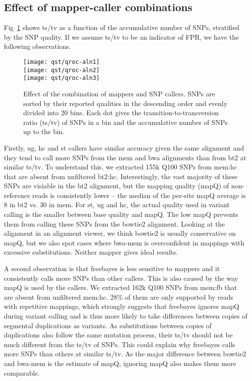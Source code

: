 \documentclass{bioinfo}
\newcommand{\textssf}[1]{\textsf{\footnotesize #1}}
\begin{document}
\subsection{Effect of mapper-caller combinations}

Fig~\ref{fig:qroc1} shows ts/tv as a function of the accumulative number of
SNPs, stratified by the SNP quality. If we assume ts/tv to be an indicator of
FPR, we have the following observations.

\begin{figure}[!hp]
\centering\texttt{[image: qst/qroc-aln1]}\\
\centering\texttt{[image: qst/qroc-aln2]}\\
\centering\texttt{[image: qst/qroc-aln3]}
\caption{Effect of the combination of mappers and SNP callers. SNPs are sorted
by their reported qualities in the descending order and evenly divided into 20
bins. Each dot gives the transition-to-transversion ratio (ts/tv) of SNPs in a
bin and the accumulative number of SNPs up to the bin.}\label{fig:qroc1} \end{figure}

Firstly, \textssf{ug}, \textssf{hc} and \textssf{st} callers have similar
accuracy given the same alignment and they tend to call more SNPs from the
\textssf{mem} and \textssf{bwa} alignments than from \textssf{bt2} at similar
ts/tv. To understand this, we extracted 155k Q100 SNPs from \textssf{mem:hc}
that are absent from unfiltered \textssf{bt2:hc}. Interestingly, the vast
majority of these SNPs are visiable in the \textssf{bt2} alignment, but the
mapping quality (mapQ) of non-reference reads is consistently lower -- the
median of the per-site mapQ average is 8 in \textssf{bt2} vs. 30 in \textssf{mem}.
For \textssf{st}, \textssf{ug} and \textssf{hc}, the actual quality used in
variant calling is the smaller between base quality and mapQ. The low mapQ
prevents them from calling these SNPs from the \textssf{bowtie2} alignment.
Looking at the alignment in an alignment viewer, we think \textssf{bowtie2} is
usually conservative on mapQ, but we also spot cases where bwa-mem is
overconfident in mappings with excessive substitutions. Neither mapper gives
ideal results.

A second observation is that \textssf{freebayes} is less sensitive to mappers and it
consistently calls more SNPs than other callers. This is also caused by the way
mapQ is used by the callers. We extracted 162k Q100 SNPs from \textssf{mem:fb}
that are absent from unfiltered \textssf{mem:hc}. 28\% of them are only
supported by reads with repetitive mappings, which strongly suggests that
\textssf{freebayes} ignores mapQ during variant calling and is thus more likely
to take differences between copies of segmental duplications as variants. As
substitutions between copies of duplications also follow the same mutation
process, their ts/tv should not be much different from the ts/tv of SNPs. This
could explain why \textssf{freebayes} calls more SNPs than others at similar
ts/tv. As the major difference between \textssf{bowtie2} and \textssf{bwa-mem}
is the estimate of mapQ, ignoring mapQ also makes them more comparable.
\end{document}
